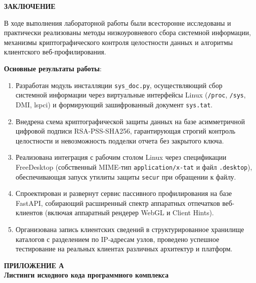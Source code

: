 \documentclass[a4paper]{article}
\begin{document}
\newpage
\begin{center}
    {\bfseries ЗАКЛЮЧЕНИЕ}
\end{center}

В ходе выполнения лабораторной работы были всесторонне исследованы и практически реализованы методы низкоуровневого сбора системной информации, механизмы криптографического контроля целостности данных и алгоритмы клиентского веб-профилирования.

\textbf{Основные результаты работы}:
\begin{enumerate}
    \item Разработан модуль инсталляции \texttt{sys\_doc.py}, осуществляющий сбор системной информации через виртуальные интерфейсы Linux (\texttt{/proc}, \texttt{/sys}, DMI, lspci) и формирующий зашифрованный документ \texttt{sys.tat}.
    \item Внедрена схема криптографической защиты данных на базе асимметричной цифровой подписи RSA-PSS-SHA256, гарантирующая строгий контроль целостности и невозможность подделки отчета без закрытого ключа.
    \item Реализована интеграция с рабочим столом Linux через спецификации FreeDesktop (собственный MIME-тип \texttt{application/x-tat} и файл \texttt{.desktop}), обеспечивающая запуск утилиты защиты \texttt{secur} при обращении к файлу.
    \item Спроектирован и развернут сервис пассивного профилирования на базе FastAPI, собирающий расширенный спектр аппаратных отпечатков веб-клиентов (включая аппаратный рендерер WebGL и Client Hints).
    \item Организована запись клиентских сведений в структурированное хранилище каталогов с разделением по IP-адресам узлов, проведено успешное тестирование на реальных клиентах различных архитектур и платформ.
\end{enumerate}

\newpage
\begin{center}
    {\bfseries ПРИЛОЖЕНИЕ А}\\[6pt]
    {\bfseries Листинги исходного кода программного комплекса}
\end{center}
\end{document}
